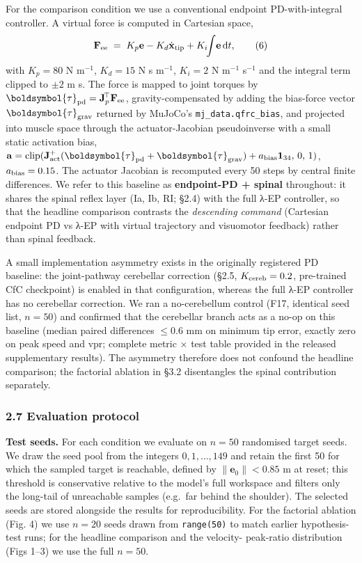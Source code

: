 \documentclass[
  11pt,
]{article}
\begin{document}
For the comparison condition we use a conventional endpoint
PD-with-integral controller. A virtual force is computed in Cartesian
space, \[
\mathbf{F}_{\rm ee} \;=\; K_{p}\mathbf{e} - K_{d}\dot{\mathbf{x}}_{\rm tip} + K_{i}\!\!\int\!\mathbf{e}\,\mathrm{d}t, \tag{6}
\] with \(K_{p} = 80\) N m\(^{-1}\), \(K_{d} = 15\) N s m\(^{-1}\),
\(K_{i} = 2\) N m\(^{-1}\) s\(^{-1}\) and the integral term clipped to
\(\pm 2\) m s. The force is mapped to joint torques by
\(\boldsymbol{\tau}_{\rm pd} = \mathbf{J}_{p}^{\!\top}\mathbf{F}_{\rm ee}\),
gravity-compensated by adding the bias-force vector
\(\boldsymbol{\tau}_{\rm grav}\) returned by MuJoCo's
\texttt{mj\_data.qfrc\_bias}, and projected into muscle space through
the actuator-Jacobian pseudoinverse with a small static activation bias,
\(\mathbf{a} = \mathrm{clip}(\mathbf{J}_{\rm act}^{+}(\boldsymbol{\tau}_{\rm pd}+\boldsymbol{\tau}_{\rm grav})+a_{\rm bias}\mathbf{1}_{34},\,0,\,1)\),
\(a_{\rm bias} = 0.15\). The actuator Jacobian is recomputed every 50
steps by central finite differences. We refer to this baseline as
\textbf{endpoint-PD + spinal} throughout: it shares the spinal reflex
layer (Ia, Ib, RI; §2.4) with the full λ-EP controller, so that the
headline comparison contrasts the \emph{descending command} (Cartesian
endpoint PD vs λ-EP with virtual trajectory and visuomotor feedback)
rather than spinal feedback.

A small implementation asymmetry exists in the originally registered PD
baseline: the joint-pathway cerebellar correction (§2.5,
\(K_{\rm cereb} = 0.2\), pre-trained CfC checkpoint) is enabled in that
configuration, whereas the full λ-EP controller has no cerebellar
correction. We ran a no-cerebellum control (F17, identical seed list,
\(n = 50\)) and confirmed that the cerebellar branch acts as a no-op on
this baseline (median paired differences \(\le 0.6\) mm on minimum tip
error, exactly zero on peak speed and vpr; complete metric × test table
provided in the released supplementary results). The asymmetry therefore
does not confound the headline comparison; the factorial ablation in
§3.2 disentangles the spinal contribution separately.

\hypertarget{evaluation-protocol}{%
\subsubsection{2.7 Evaluation protocol}\label{evaluation-protocol}}

\textbf{Test seeds.} For each condition we evaluate on \(n = 50\)
randomised target seeds. We draw the seed pool from the integers
\(0,1,\dots, 149\) and retain the first 50 for which the sampled target
is reachable, defined by \(\|\mathbf{e}_{0}\| < 0.85\) m at reset; this
threshold is conservative relative to the model's full workspace and
filters only the long-tail of unreachable samples (e.g.~far behind the
shoulder). The selected seeds are stored alongside the results for
reproducibility. For the factorial ablation (Fig. 4) we use \(n = 20\)
seeds drawn from \texttt{range(50)} to match earlier hypothesis-test
runs; for the headline comparison and the velocity- peak-ratio
distribution (Figs 1--3) we use the full \(n = 50\).
\end{document}
